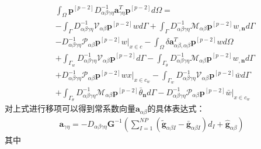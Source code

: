 \begin{equation}
\begin{split}
        &\int_{\Omega}\pmb{p}^{[p-2]}D^{-1}_{\alpha\beta\gamma\eta}\pmb{a}_{\gamma\eta}^T\pmb{p}^{[p-2]}d\Omega=\\
        &-\int_{\Gamma}D_{\alpha\beta\gamma\eta}^{-1}\mathcal{V}_{\alpha\beta}\pmb{p}^{[p-2]}wd\Gamma
        +\int_{\Gamma}D_{\alpha\beta\gamma\eta}^{-1}\mathcal{M}_{\alpha\beta}\pmb{p}^{[p-2]}w_{,\pmb{n}}d\Gamma\\
        &-D_{\alpha\beta\gamma\eta}^{-1}\mathcal{P}_{\alpha\beta}\pmb{p}^{[p-2]}w\vert_{x\in c}
        -\int_{\Omega}\delta\pmb{a}_{\alpha\beta,\alpha\beta}^T\pmb{p}^{[p-2]}wd\Omega\\
        &+\int_{\Gamma_w}D_{\alpha\beta\gamma\eta}^{-1}\mathcal{V}_{\alpha\beta}\pmb{p}^{[p-2]}d\Gamma
        -\int_{\Gamma_{\theta}}D_{\alpha\beta\gamma\eta}^{-1}\mathcal{M}_{\alpha\beta}\pmb{p}^{[p-2]}w_{,\pmb{n}}d\Gamma\\
        &+D_{\alpha\beta\gamma\eta}^{-1}\mathcal{P}_{\alpha\beta}\pmb{p}^{[p-2]}wx\vert_{x\in{c_w}}
        -\int_{\Gamma_w}D_{\alpha\beta\gamma\eta}^{-1}\mathcal{V}_{\alpha\beta}\pmb{p}^{[p-2]}\bar{w}d\Gamma\\
        &+\int_{\Gamma_{\theta}}D_{\alpha\beta\gamma\eta}^{-1}\mathcal{M}_{\alpha\beta}\pmb{p}^{[p-2]}\bar{\theta}_{\pmb{n}}d\Gamma
        -D_{\alpha\beta\gamma\eta}^{-1}\mathcal{P}_{\alpha\beta}\pmb{p}^{[p-2]}\bar{w}\vert_{x\in{c_w}}
\end{split}
\end{equation}
对上式进行移项可以得到常系数向量$\pmb{a}_{\alpha\beta}$的具体表达式：
\begin{equation}\label{aalphabeta}
\begin{split}
    \pmb{a}_{\gamma\eta}=-D_{\alpha\beta\gamma\eta}\pmb{G}^{-1}(\sum_{I=1}^{N\!P}(\tilde{\pmb g}_{\alpha\beta I}-\bar{\pmb g}_{\alpha\beta I})d_I+\hat{\pmb g}_{\alpha\beta})
\end{split}
\end{equation}
其中
